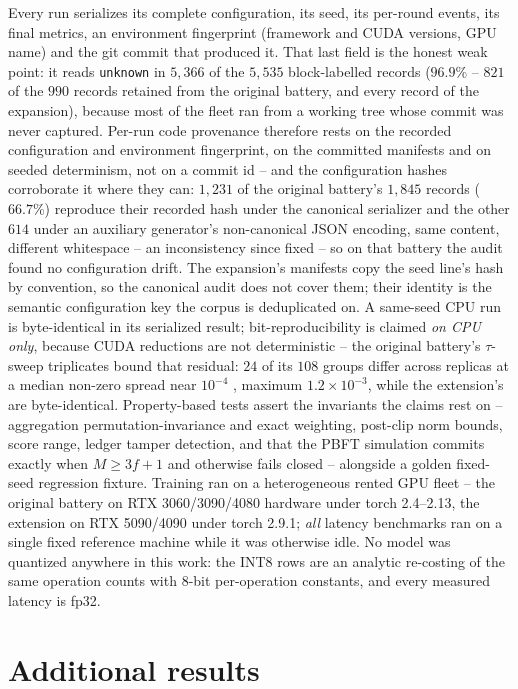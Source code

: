 \documentclass[review,12pt]{elsarticle}
\begin{document}
Every run serializes its complete configuration, its seed, its per-round
events, its final metrics, an environment fingerprint (framework and
CUDA versions, GPU name) and the git commit that produced it. That last
field is the honest weak point: it reads \texttt{unknown} in $5{,}366$
of the $5{,}535$ block-labelled records ($96.9\%$ -- $821$ of the $990$
records retained from the original battery, and every record of the
expansion), because most of the fleet ran from a working tree whose
commit was never captured. Per-run code provenance therefore rests on
the recorded configuration and environment fingerprint, on the
committed manifests and on seeded determinism, not on a commit id --
and the configuration hashes corroborate it where they can: $1{,}231$ of
the original battery's $1{,}845$ records ($66.7\%$) reproduce their
recorded hash under the canonical serializer and the other $614$ under
an auxiliary generator's non-canonical JSON encoding, same content,
different whitespace -- an inconsistency since fixed -- so on that
battery the audit found no configuration drift. The expansion's
manifests copy the seed line's hash by convention, so the canonical
audit does not cover them; their identity is the semantic configuration
key the corpus is deduplicated on. A same-seed CPU run is byte-identical
in its serialized result; bit-reproducibility is claimed \emph{on CPU
only}, because CUDA reductions are not deterministic -- the original
battery's $\tau$-sweep triplicates bound that residual: $24$ of its
$108$ groups differ across replicas at a median non-zero spread near
$10^{-4}$ \macroF{}, maximum $1.2\times10^{-3}$, while the extension's
are byte-identical. Property-based tests assert the invariants the
claims rest on -- aggregation permutation-invariance and exact
weighting, post-clip norm bounds, score range, ledger tamper detection,
and that the PBFT simulation commits exactly when $M \ge 3f+1$ and
otherwise fails closed -- alongside a golden fixed-seed regression
fixture. Training ran on a heterogeneous rented GPU fleet -- the
original battery on RTX 3060/3090/4080 hardware under torch 2.4--2.13,
the extension on RTX 5090/4090 under torch 2.9.1; \emph{all} latency
benchmarks ran on a single fixed reference machine while it was
otherwise idle. No model was quantized anywhere in this work: the INT8
rows are an analytic re-costing of the same operation counts with 8-bit
per-operation constants, and every measured latency is fp32.

\section{Additional results}
\label{sec:sup-results}
\end{document}
